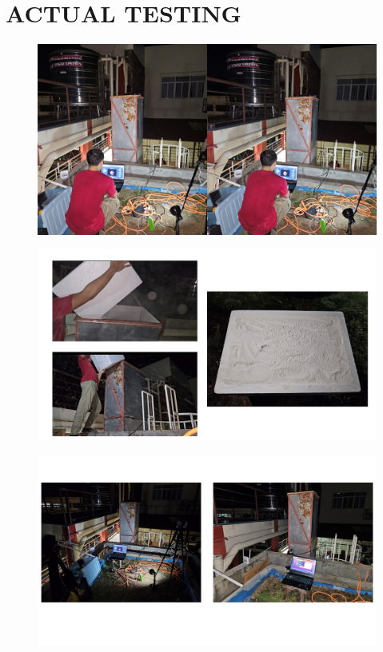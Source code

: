 \section*{ACTUAL TESTING}

\begin{figure}[H]
	\centering
	\includegraphics[width=1\textwidth]{Figures/Appendecis/testing/Slide5}
\end{figure}
\begin{figure}[H]
	\centering
	\includegraphics[width=1\textwidth]{Figures/Appendecis/testing/Slide6}
\end{figure}
\begin{figure}[H]
	\centering
	\includegraphics[width=1\textwidth]{Figures/Appendecis/testing/Slide7}
\end{figure}
